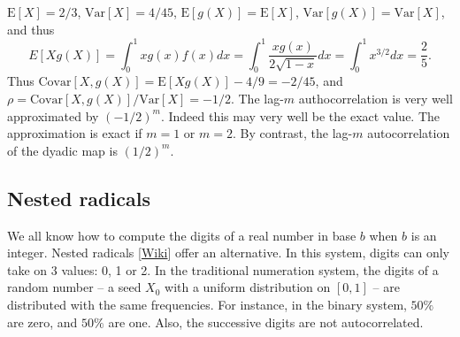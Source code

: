 \documentclass[oneside,10pt]{book}
\begin{document}
$\text{E}[X] = 2/3$, $\text{Var}[X] = 4/45$, $\text{E}[g(X)] = \text{E}[X]$, $\text{Var}[g(X)] = \text{Var}[X]$, and thus
$$
E[X g(X)] =\int_0^1 x g(x)f(x)dx = \int_0^1 \frac{xg(x)}{2\sqrt{1-x}}dx=  \int_0^1 x^{3/2}dx = \frac{2}{5}.
$$
Thus $\text{Covar}[X, g(X)] = \text{E}[X g(X)] - 4/9 = -2/45$, and
$\rho=\text{Covar}[X, g(X)] / \text{Var}[X] = -1/2$. The lag-$m$ authocorrelation
 is very well approximated by $(-1/2)^m$. Indeed this may very well be the exact value. The approximation is exact if $m=1$ or $m=2$.
 By contrast, the lag-$m$ autocorrelation of the \textcolor{index}{dyadic map} is $(1/2)^m$.



\subsection{Nested radicals}\label{prasoil}

We all know how to compute the digits of a real number in base $b$ when $b$ is an integer.
\textcolor{index}{Nested radicals} [\href{https://en.wikipedia.org/wiki/Nested_radical}{Wiki}]
offer an alternative. In this system, digits can only take on  3 values: 0, 1 or 2. In the traditional numeration system, the
 digits of a random number -- a seed $X_0$ with a uniform distribution on $[0, 1]$ -- are distributed with the same frequencies. For instance, in the binary system, $50\%$ are zero, and $50\%$ are one. Also, the successive digits are not autocorrelated.
\end{document}
